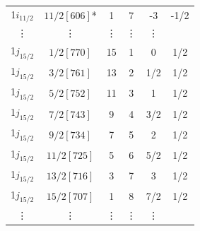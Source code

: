 \documentclass[10pt,a4paper, twoside]{report}
\begin{document}
\begin{table}[htbp]
\begin{tabular}{|c|c|c|c|c|c|}
1$i_{11/2}$ & $11/2[606]$*           & 1          & 7             & -3       & -1/2        \\
\vdots      & \vdots                & \vdots     & \vdots        & \vdots           \\
\midrule
1$j_{15/2}$ & $1/2[770]$            & 15         & 1             & 0          & 1/2     \\
1$j_{15/2}$ & $3/2[761]$            & 13         & 2             & 1/2       & 1/2        \\
1$j_{15/2}$ & $5/2[752]$            & 11         & 3             & 1           & 1/2    \\
1$j_{15/2}$ & $7/2[743]$            & 9          & 4             & 3/2        & 1/2       \\
1$j_{15/2}$ & $9/2[734]$            & 7          & 5             & 2         & 1/2      \\
1$j_{15/2}$ & $11/2[725]$            & 5          & 6             & 5/2         & 1/2      \\
1$j_{15/2}$ & $13/2[716]$            & 3          & 7             & 3       & 1/2        \\
1$j_{15/2}$ & $15/2[707]$            & 1          & 8             & 7/2       & 1/2        \\
\vdots      & \vdots                & \vdots     & \vdots        & \vdots           \\
\bottomrule
\bottomrule
\end{tabular}
\end{table}
\newpage
\end{document}
